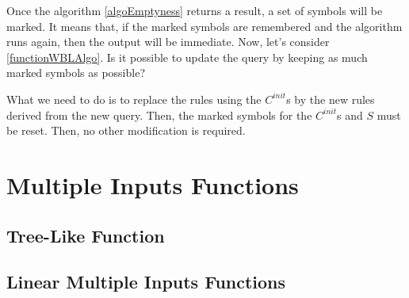 \documentclass[10pt,a4paper,draft]{article}
\begin{document}
Once the algorithm \ref{algoEmptyness} returns a result, a set of symbols will be marked. It means that, if the marked symbols are remembered and the algorithm runs again, then the output will be immediate. Now, let's consider \ref{functionWBLAlgo}. Is it possible to update the query by keeping as much marked symbols as possible?

What we need to do is to replace the rules using the $C^{init}$s by the new rules derived from the new query. Then, the marked symbols for the $C^{init}$s and $S$ must be reset. Then, no other modification is required.

\section{Multiple Inputs Functions}

\subsection{Tree-Like Function}

\subsection{Linear Multiple Inputs Functions}



\end{document}
